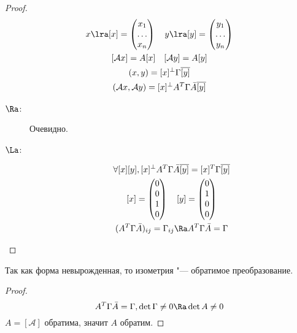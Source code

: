 \begin{proof}
	\begin{gather*}
		x \lra [x] = \begin{pmatrix} x_1\\ \dots\\ x_n\\ \end{pmatrix} \quad
		y \lra [y] = \begin{pmatrix} y_1\\ \dots\\ y_n\\ \end{pmatrix} \\
		[\mathcal A x] = A[x] \quad
		[\mathcal A y] = A[y] \\
		(x, y) = [x]^\bot \Gamma \overline{[y]} \\
		(\mathcal A x, \mathcal A y) = [x]^\bot A^T \Gamma \bar A  \overline{[y]}
	\end{gather*}
	\begin{description}
	\item[$\Ra$:]
		Очевидно.

	\item[$\La$:]
		\begin{gather*}
			\forall [x][y], [x]^\bot A^T \Gamma\bar A \overline{[y]} = [x]^T  \Gamma \overline{[y]} \\
			[x] = \begin{pmatrix} 0 \\ 0 \\ 1\\ 0 \\ \end{pmatrix} \quad
			[y] = \begin{pmatrix} 0\\ 1\\ 0\\ 0\\ \end{pmatrix} \\
			(A^T \Gamma \bar A )_{ij} = \Gamma_{ij} \Ra A^T \Gamma \bar A  = \Gamma
		\end{gather*}
	\end{description}
\end{proof}

\begin{conseq}
	Так как форма невырожденная, то изометрия "--- обратимое преобразование.
\end{conseq}
\begin{proof}
	\[ A^T \Gamma \bar A  = \Gamma, \det \Gamma \ne 0 \Ra \det A \ne 0 \]
	$A = [\mathcal A]$ обратима, значит $A$ обратим.
\end{proof}

